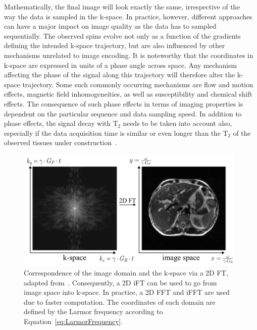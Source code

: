 Mathematically, the final image will look exactly the same, irrespective of the way the data is sampled in the k-space. In practice, however, different approaches 
can have a major impact on image quality
as the data has to 
sampled
sequentially. The observed spins evolve not only as a function of the gradients defining the intended k-space trajectory, but are also influenced by other mechanisms unrelated to image encoding. It is noteworthy that the coordinates in k-space are expressed in units of a phase angle across space. Any mechanism affecting the phase of the signal along this trajectory will therefore alter the k-space trajectory. Some such commonly occurring mechanisms are flow and motion effects, magnetic field inhomogeneities, as well as susceptibility and chemical shift effects. The consequence of such phase effects in terms of imaging properties is dependent on the particular sequence and data sampling speed. In addition to phase effects, the signal decay with $\text{T}_2$ needs to be taken into account also, especially if the data acquisition time is similar or even longer than the $\text{T}_2$ of the observed tissues under construction~\cite{SamplingStrategies}.

\begin{figure}[h] %
	\centering
	\includegraphics[width=\linewidth]{./Images/2D_MRI_Measurement.png} 
	\caption{Correspondence of the image domain and the k-space via a 2D FT, adapted from~\cite{SamplingStrategies}. Consequently, a 2D iFT can be used to go from image space into k-space. In practice, a 2D FFT and iFFT are used due to faster computation. The coordinates of each domain are defined by the Larmor frequency according to Equation~\ref{eq:LarmorFrequency}.}
	\label{fig:2D_MRI_Measurement}
\end{figure}

